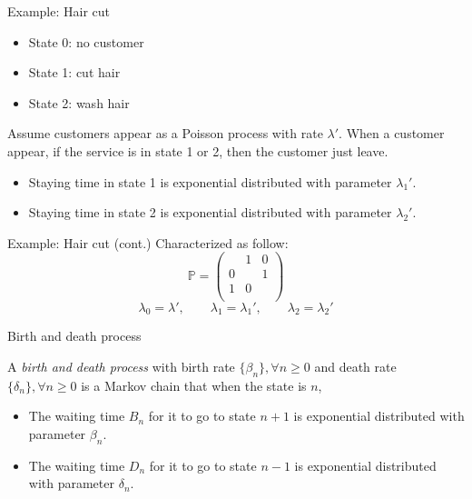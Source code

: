 \documentclass[mathserif]{beamer}
\begin{document}
\begin{frame}{Example: Hair cut}
\begin{itemize}
\item State 0: no customer
\item State 1: cut hair
\item State 2: wash hair
\end{itemize}
Assume customers appear as a Poisson process with rate $\lambda'$.
When a customer appear, if the service is in state 1 or 2, then the customer just leave.
\begin{itemize}
\item Staying time in state 1 is exponential distributed with parameter ${\lambda_1}'$.
\item Staying time in state 2 is exponential distributed with parameter ${\lambda_2}'$.
\end{itemize}
\end{frame}

\begin{frame}{Example: Hair cut (cont.)}
Characterized as follow:
\[
\mathbb{P} = 
\begin{pmatrix}
& 1 & 0 \\
0 & & 1 \\
1 & 0 & \\
\end{pmatrix}
\]
\[
\lambda_0 = \lambda', \qquad \lambda_1 = {\lambda_1}', \qquad \lambda_2 = {\lambda_2}'
\]
\end{frame}

\begin{frame}{Birth and death process}
\begin{definition}
A \emph{birth and death process} with birth rate $\{\beta_n\}, \forall n\geq 0$ and death rate $\{\delta_n\}, \forall n\geq 0$ is a Markov chain that when the state is $n$, 
\begin{itemize}
\item The waiting time $B_n$ for it to go to state $n+1$ is exponential distributed with parameter $\beta_n$.
\item The waiting time $D_n$ for it to go to state $n-1$ is exponential distributed with parameter $\delta_n$.
\end{itemize}
\end{definition}
\end{frame}
\end{document}
